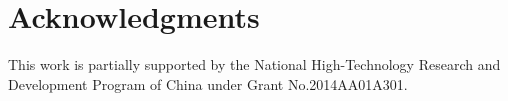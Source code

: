 \documentclass{sig-alternate-05-2015}
\begin{document}
\section{Acknowledgments}
This work is partially supported by the National High-Technology Research and Development Program of China under Grant No.2014AA01A301.

%

%
%
\end{document}
